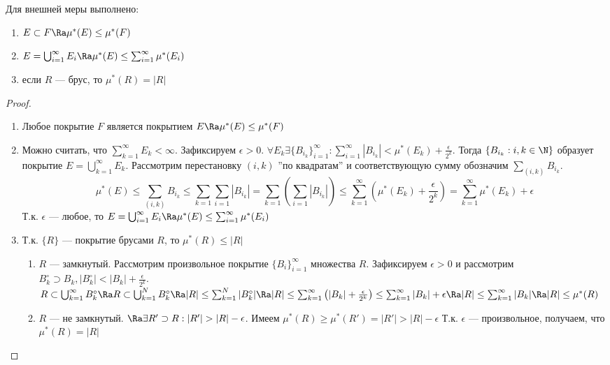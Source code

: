 \begin{theorem}
    Для внешней меры выполнено:
    \begin{enumerate}
        \item \(E \subset F \Ra \mu^*(E) \le \mu^*(F)\)
        \item \(E = \bigcup_{i = 1}^\infty E_i \Ra \mu^*(E) \le \sum_{i = 1}^\infty \mu^*(E_i)\)
        \item если \(R\) --- брус, то \(\mu^*(R) = |R|\)
    \end{enumerate}
\end{theorem}
\begin{proof}
    \begin{enumerate}
        \item Любое покрытие \(F\) является покрытием \(E \Ra \mu^*(E) \le \mu^*(F)\)
        \item Можно считать, что \(\sum_{k = 1}^\infty E_k < \infty\). Зафиксируем \(\epsilon > 0\). \(\forall E_k \exists \{B_{i_k}\}_{i = 1}^\infty: \sum_{i = 1}^\infty |B_{i_k}| < \mu^*(E_k) + \frac{\epsilon}{2^k}\). Тогда \(\{B_{i_k}: i, k \in \N\}\) образует покрытие \(E = \bigcup_{k = 1}^\infty E_k\). Рассмотрим перестановку \((i, k)\) ''по квадратам'' и соответствующую сумму обозначим \(\sum_{(i, k)} B_{i_k}\). 
        \[\mu^*(E) \le \sum_{(i, k)} B_{i_k} \le \sum_{k = 1}\sum_{i = 1}|B_{i_k}| = \sum_{k = 1}\left(\sum_{i = 1}|B_{i_k}|\right) \le \sum_{k = 1}^\infty \left(\mu^*(E_k) + \frac{\epsilon}{2^k}\right) = \sum_{k = 1}^\infty \mu^*(E_k) + \epsilon\]
        Т.к. \(\epsilon\) --- любое, то \(E = \bigcup_{i = 1}^\infty E_i \Ra \mu^*(E) \le \sum_{i = 1}^\infty \mu^*(E_i)\)

        \item Т.к. \(\{R\}\) --- покрытие брусами \(R\), то \(\mu^*(R) \le |R|\)
        \begin{enumerate}
            \item \(R\) --- замкнутый. Рассмотрим произвольное покрытие \(\{B_i\}_{i = 1}^\infty\) множества \(R\). Зафиксируем \(\epsilon > 0\) и рассмотрим \(B_k^\circ \supset B_k, |B_k^\circ| < |B_k| + \frac{\epsilon}{2^k}\). \(R \subset \bigcup_{k = 1}^\infty B_k^\circ \Ra R \subset \bigcup_{k = 1}^N B_k^\circ \Ra |R| \le \sum_{k = 1}^N |B_k^\circ| \Ra |R| \le \sum_{k = 1}^\infty\left(|B_k| + \frac{\epsilon}{2^k}\right) \le \sum_{k = 1}^\infty |B_k| + \epsilon \Ra |R| \le \sum_{k = 1}^\infty |B_k| \Ra |R| \le \mu^*(R)\)
            \item \(R\) --- не замкнутый. \(\Ra \exists R' \supset R: |R'| > |R| - \epsilon\). Имеем \(\mu^*(R) \ge \mu^*(R') = |R'| > |R| - \epsilon\) Т.к. \(\epsilon\) --- произвольное, получаем, что \(\mu^*(R) = |R|\)
        \end{enumerate}
    \end{enumerate}
\end{proof}

